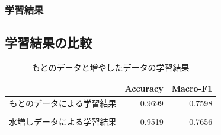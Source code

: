 \documentclass[leno,xcolor=dvipsnames]{beamer}
\begin{document}
  \begin{frame}
    \frametitle{学習結果}
    \subsection{学習結果の比較}
    \begin{table}[H]
      \centering
      \caption{もとのデータと増やしたデータの学習結果}
      \begin{tabular}{rrr}
        \toprule
        & Accuracy & Macro-F1 \\
        \midrule
        もとのデータによる学習結果 & 0.9699 & 0.7598\footnote{クラスDのTPとFPが共にゼロとなりあまり正確ではない\\} \\
        水増しデータによる学習結果 & 0.9519 & 0.7656 \\ 
        \bottomrule
      \end{tabular}
    \end{table}
  \end{frame}
\end{document}
